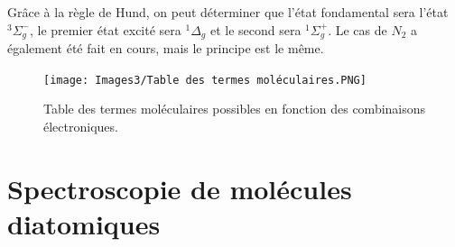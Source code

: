 Grâce à la règle de Hund, on peut déterminer que l'état fondamental sera l'état $^3\Sigma_g^-$, le premier état excité sera $^1\Delta_g$ et le second sera $^1\Sigma^+_g$.\newline
Le cas de $N_2$ a également été fait en cours, mais le principe est le même.
\begin{figure}
    \centering
    \texttt{[image: Images3/Table des termes moléculaires.PNG]}
    \caption{Table des termes moléculaires possibles en fonction des combinaisons électroniques.}
    \label{fig:termes_mol}
\end{figure}

\section{Spectroscopie de molécules diatomiques}

